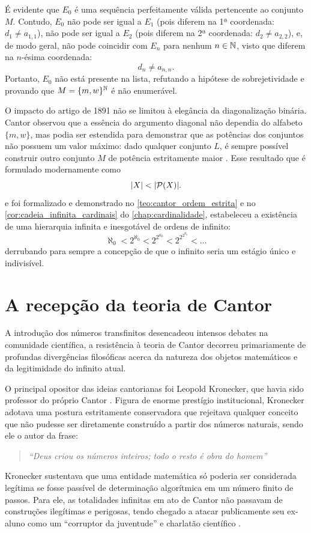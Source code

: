 É evidente que \(E_0\) é uma sequência perfeitamente válida pertencente ao conjunto \(M\). Contudo, \(E_0\) não pode ser igual a \(E_1\) (pois diferem na 1ª coordenada: \(d_1 \neq a_{1,1}\)), não pode ser igual a \(E_2\) (pois diferem na 2ª coordenada: \(d_2 \neq a_{2,2}\)), e, de modo geral, não pode coincidir com \(E_n\) para nenhum \(n \in \mathbb{N}\), visto que diferem na \(n\)-ésima coordenada:
\[
    d_n \neq a_{n,n}.
\]
Portanto, \(E_0\) não está presente na lista, refutando a hipótese de sobrejetividade e provando que \(M = \{m, w\}^{\mathbb{N}}\) é não enumerável.

O impacto do artigo de 1891 não se limitou à elegância da diagonalização binária. Cantor observou que a essência do argumento diagonal não dependia do alfabeto \(\{m, w\}\), mas podia ser estendida para demonstrar que as potências dos conjuntos não possuem um valor máximo: dado qualquer conjunto \(L\), é sempre possível construir outro conjunto \(M\) de potência estritamente maior \parencites[p.~166]{dauben1990}[p.~431]{bertato2023}. Esse resultado que é formulado modernamente como
\[
    |X| < |\mathcal{P}(X)|.
\]
e foi formalizado e demonstrado no \autoref{teo:cantor_ordem_estrita} e no \autoref{cor:cadeia_infinita_cardinais} do \autoref{chap:cardinalidade}, estabeleceu a existência de uma hierarquia infinita e inesgotável de ordens de infinito:
\[
    \aleph_0 < 2^{\aleph_0} < 2^{2^{\aleph_0}} < 2^{2^{2^{\aleph_0}}} < \dots
\]
derrubando para sempre a concepção de que o infinito seria um estágio único e indivisível.

\section{A recepção da teoria de Cantor}
\label{sec:recepcao_controversias}

A introdução dos números transfinitos desencadeou intensos debates na comunidade científica, a resistência à teoria de Cantor decorreu primariamente de profundas divergências filosóficas acerca da natureza dos objetos matemáticos e da legitimidade do infinito atual.

O principal opositor das ideias cantorianas foi Leopold Kronecker, que havia sido professor do próprio Cantor \parencite[p.~65]{maor1991}. Figura de enorme prestígio institucional, Kronecker adotava uma postura estritamente conservadora que rejeitava qualquer conceito que não pudesse ser diretamente construído a partir dos números naturais, sendo ele o autor da frase:
\begin{quote}
    \textit{``Deus criou os números inteiros; todo o resto é obra do homem''}
\end{quote}
Kronecker sustentava que uma entidade matemática só poderia ser considerada legítima se fosse passível de determinação algorítmica em um número finito de passos. Para ele, as totalidades infinitas em ato de Cantor não passavam de construções ilegítimas e perigosas, tendo chegado a atacar publicamente seu ex-aluno como um ``corruptor da juventude'' e charlatão científico \parencite[p.~1]{dauben1990}.

